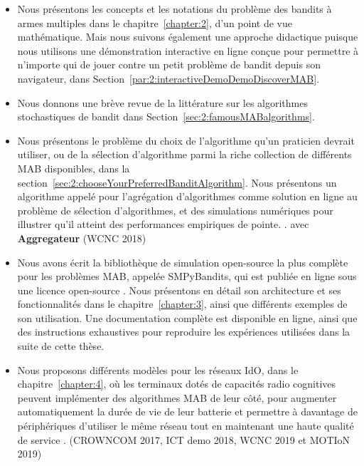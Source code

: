 \begin{resume_fr}
\begin{itemize}
    \item
    Nous présentons les concepts et les notations du problème des bandits à armes multiples dans le chapitre~\ref{chapter:2}, d'un point de vue mathématique.
    Mais nous suivons également une approche didactique puisque nous utilisons une démonstration interactive en ligne conçue pour permettre à n'importe qui de jouer contre un petit problème de bandit depuis son navigateur, dans Section~\ref{par:2:interactiveDemoDemoDiscoverMAB}.

    \item
    Nous donnons une brève revue de la littérature sur les algorithmes stochastiques de bandit dans Section~\ref{sec:2:famousMABalgorithms}.

    \item
    Nous présentons le problème du choix de l'algorithme qu'un praticien devrait utiliser, ou de la sélection d'algorithme parmi la riche collection de différents MAB disponibles, dans la section~\ref{sec:2:chooseYourPreferredBanditAlgorithm}.
    Nous présentons un algorithme appelé \Aggr{} pour l'agrégation d'algorithmes comme solution en ligne au problème de sélection d'algorithmes, et des simulations numériques pour illustrer qu'il atteint des performances empiriques de pointe.
    \cite{Besson2018WCNC}.
    avec \textbf{Aggregateur} (WCNC 2018)

    \item
    Nous avons écrit la bibliothèque de simulation open-source la plus complète pour les problèmes MAB, appelée SMPyBandits, qui est publiée en ligne sous une licence open-source \cite{SMPyBandits,SMPyBanditsJMLR}.
    Nous présentons en détail son architecture et ses fonctionnalités dans le chapitre~\ref{chapter:3}, ainsi que différents exemples de son utilisation.
    Une documentation complète est disponible en ligne, ainsi que des instructions exhaustives pour reproduire les expériences utilisées dans la suite de cette thèse.

    \item
    Nous proposons différents modèles pour les réseaux IdO, dans le chapitre~\ref{chapter:4}, où les terminaux dotés de capacités radio cognitives peuvent implémenter des algorithmes MAB de leur côté, pour augmenter automatiquement la durée de vie de leur batterie et permettre à davantage de périphériques d'utiliser le même réseau tout en maintenant une haute qualité de service
    \cite{Bonnefoi17,Besson2019WCNC,Bonnefoi2019WCNC}.
    (CROWNCOM 2017, ICT demo 2018, WCNC 2019 et MOTIoN 2019)


\end{itemize}
\end{resume_fr}
